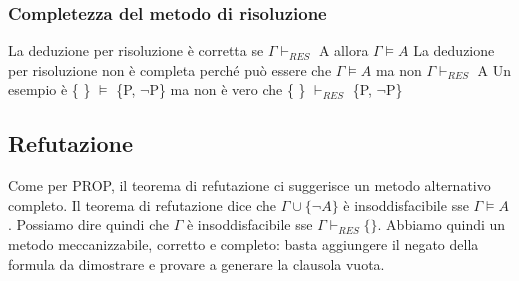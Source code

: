 \documentclass{article}
\begin{document}
\subsubsection{Completezza del metodo di risoluzione}
La deduzione per risoluzione è corretta	se $\Gamma \vdash _{RES}$ A allora $\Gamma \models A$ \newline
La deduzione per risoluzione non è completa perché può essere che $\Gamma \models A$ ma non $\Gamma \vdash _{RES}$ A \newline
Un esempio è \{ \} $\models$ \{P, $\neg$P\} ma non è vero che \{ \} $\vdash _{RES}$ \{P, $\neg$P\}

\subsection{Refutazione}
Come per PROP, il teorema di refutazione ci suggerisce un metodo alternativo completo. 
Il teorema di refutazione dice che $\Gamma \cup \{\neg A\}$ è insoddisfacibile sse $\Gamma \models A$. \newline
Possiamo dire quindi che $\Gamma$ è insoddisfacibile sse $\Gamma \vdash _{RES} \{\}$. \newline Abbiamo quindi un metodo meccanizzabile, corretto e completo: basta aggiungere il negato della formula da dimostrare e provare a generare la clausola vuota.
\end{document}
